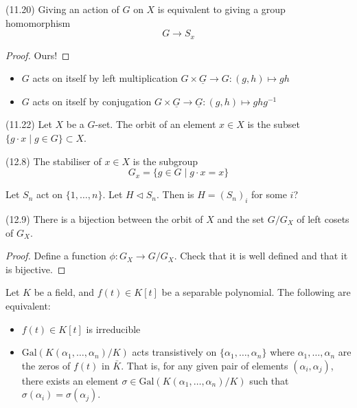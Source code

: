 \vspace{2ex}
\begin{prop}
(11.20) Giving an action of $G$ on $X$ is equivalent to giving a group homomorphism 
\[G\rightarrow S_{x}\]
\end{prop}
\vspace{2ex}
\begin{proof}
Ours! 
\end{proof}
\vspace{2ex}
\begin{ex}
\begin{itemize}
\item[(i)] $G$ acts on itself by left multiplication $G\times \underline{G}\rightarrow G:(g,h)\mapsto gh$
\item[(ii)] $G$ acts on itself by conjugation $G\times \underline{G}\rightarrow \underline{G}:(g,h)\mapsto ghg^{-1}$ 
\end{itemize}
\end{ex}
\vspace{2ex}
\begin{defi}
(11.22) Let $X$ be a $G$-set. The orbit of an element $x\in X$ is the subset $\{g\cdot x\;|\;g\in G\}\subset X$.
\end{defi}
\vspace{2ex}
\begin{defi}
(12.8) The stabiliser of $x\in X$ is the subgroup
\[G_{x}=\{g\in G\;|\;g\cdot x=x\}\]
\end{defi}
\vspace{2ex}
\begin{prop}
Let $S_{n}$ act on $\{1,\ldots ,n\}$. Let $H\triangleleft S_{n}$. Then is $H=(S_{n})_{i}$ for some $i$?
\end{prop}
\vspace{2ex}
\begin{lem}
(12.9) There is a bijection between the orbit of $X$ and the set $G/G_{X}$ of left cosets of $G_{X}$. 
\end{lem}
\vspace{2ex}
\begin{proof}
Define a function $\phi :G_{X}\rightarrow G/G_{X}$. Check that it is well defined and that it is bijective. 
\end{proof}
\vspace{2ex}
\begin{prop}
Let $K$ be a field, and $f(t)\in K[t]$ be a separable polynomial. The following are equivalent:
\begin{itemize}
\item[(i)] $f(t)\in K[t]$ is irreducible
\item[(ii)] $\mathrm{Gal}(K(\alpha_1,\ldots ,\alpha _{n})/K)$ acts transistively on $\{\alpha _1,\ldots ,\alpha _{n}\}$ where $\alpha_1,\ldots ,\alpha _{n}$ are the zeros of $f(t)$ in $\bar{K}$. That is, for any given pair of elements $(\alpha _{i},\alpha _{j})$, there exists an element $\sigma \in \mathrm{Gal}(K(\alpha_1,\ldots ,\alpha _{n})/K)$ such that $\sigma (\alpha _{i})=\sigma(\alpha _{j})$.
\end{itemize}
\end{prop}
